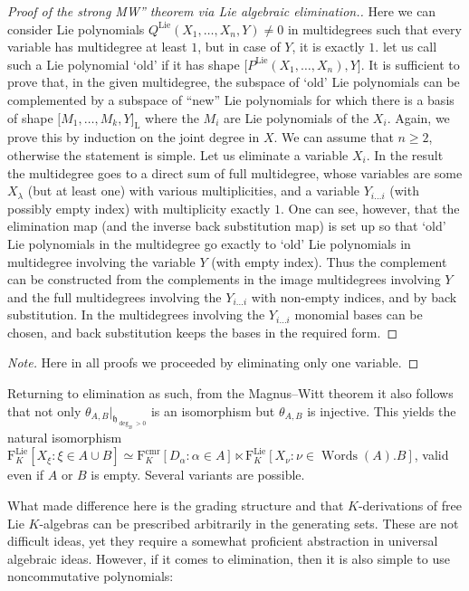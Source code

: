 \documentclass[11pt,a4paper]{amsart}
\DeclareMathOperator{\Lie}{Lie}
\DeclareMathOperator{\Words}{Words}
\DeclareMathOperator{\cmr}{cmr}
\newcommand{\bo}{\boldsymbol}
\theoremstyle{definition}
\theoremstyle{plain}
\begin{document}
\begin{proof}[Proof of the strong MW''  theorem via Lie algebraic elimination.]
Here we can consider Lie polynomials $Q^{\Lie}(X_1,\ldots,X_n,Y)\neq 0$
 in multidegrees such that every variable has multidegree at least $1$, but in case of $Y$,
 it is exactly $1$. let us call such a Lie polynomial `old' if it has shape
 $\bo[P^{\Lie}(X_1,\ldots,X_n),Y\bo]$.
It is sufficient to prove that, in the given multidegree, the subspace of `old' Lie polynomials
 can be complemented by a subspace of ``new'' Lie polynomials for which there is a basis of shape
 $ \bo[M_1,\ldots,M_k,Y\bo]_{\mathrm L}$ where the $M_i$ are Lie polynomials of the $X_i$.
Again, we prove this by induction on the joint degree in $X$.
We can assume that $n\geq2$, otherwise the statement is simple.
Let us eliminate a variable $X_i$.
In the result the multidegree goes to a direct sum of full multidegree, whose variables
 are some $X_\lambda$ (but at least one) with various multiplicities, and a variable $Y_{i\ldots i}$
 (with possibly empty index) with multiplicity exactly $1$.
One can see, however, that the elimination map (and the inverse back substitution map)
 is set up so that `old' Lie polynomials in the multidegree go exactly to
 `old' Lie polynomials in multidegree involving the variable $Y$ (with empty index).
Thus the complement can be constructed from the complements in the image multidegrees
 involving $Y$ and the full multidegrees involving the  $Y_{i\ldots i}$ with non-empty indices,
 and by back substitution.
In the  multidegrees involving the  $Y_{i\ldots i}$ monomial bases can be chosen, and
 back substitution keeps the bases in the required form.
\end{proof}
 \renewcommand{\qedsymbol}{$\triangle$}
\begin{proof}[Note]
Here in all proofs we proceeded by eliminating only one variable.
\end{proof}
\renewcommand{\qedsymbol}{$\Box$}

Returning to elimination as such, from the Magnus--Witt theorem it also follows that not only
 $\theta_{A,B}|_{\mathfrak h_{\deg_B>0}}$ is an isomorphism but $\theta_{A,B}$ is injective.
This yields the natural isomorphism
 $\mathrm F^{\Lie}_K[X_\xi :\xi\in A\cup B]\simeq \mathrm F^{\cmr}_K[D_\alpha :\alpha\in A]\ltimes
 \mathrm F^{\Lie}_K[X_\nu :\nu\in\Words(A).B]$,
 valid even if $A$ or $B$ is empty.
Several variants are possible.

What made difference here is the grading structure and that $K$-derivations of free Lie $K$-algebras can be
 prescribed arbitrarily in the generating sets.
These are not difficult ideas, yet they require a somewhat proficient abstraction in universal algebraic ideas.
However, if it comes to elimination, then it is also simple to use noncommutative polynomials:
\end{document}
